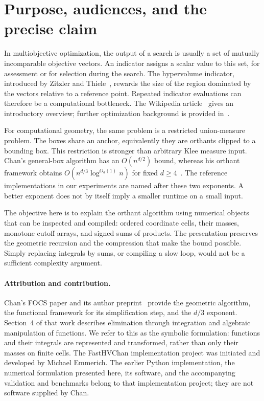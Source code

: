 \documentclass[12pt,a4paper]{article}
\theoremstyle{definition}
\begin{document}
\section{Purpose, audiences, and the precise claim}
\label{sec:introduction}

In multiobjective optimization, the output of a search is usually a set
of mutually incomparable objective vectors. An indicator assigns a scalar
value to this set, for assessment or for selection during the search.
The hypervolume indicator, introduced by Zitzler and Thiele~\cite{zitzlerthiele1998},
rewards the size of the region dominated by the vectors relative to a
reference point. Repeated indicator evaluations can therefore be a
computational bottleneck. The Wikipedia article~\cite{wikipediahv} gives
an introductory overview; further optimization background is provided
in~\cite{emmerichdeutz2018}.

For computational geometry, the same problem is a restricted union-measure
problem. The boxes share an anchor, equivalently they are orthants clipped
to a bounding box. This restriction is stronger than arbitrary Klee
measure input. Chan's general-box algorithm has an $O(n^{d/2})$ bound,
whereas his orthant framework obtains
$O(n^{d/3}\log^{O_d(1)}n)$ for fixed $d\ge4$~\cite{chan2013}.
The reference implementations in our experiments are named after these
two exponents. A better exponent does not by itself imply a smaller
runtime on a small input.

The objective here is to explain the orthant algorithm using numerical
objects that can be inspected and compiled: ordered coordinate cells,
their masses, monotone cutoff arrays, and signed sums of products.
The presentation preserves the geometric recursion and the compression
that make the bound possible. Simply replacing integrals by sums, or
compiling a slow loop, would not be a sufficient complexity argument.

\paragraph{Attribution and contribution.}
Chan's FOCS paper and its author preprint~\cite{chan2013} provide the
geometric algorithm, the functional framework for its simplification
step, and the $d/3$ exponent. Section~4 of that work describes elimination
through integration and algebraic manipulation of functions. We refer
to this as the symbolic formulation: functions and their integrals are
represented and transformed, rather than only their masses on finite cells.
The FastHVChan implementation project was initiated and developed by
Michael Emmerich. The earlier Python implementation, the numerical
formulation presented here, its software, and the accompanying validation
and benchmarks belong to that implementation project; they are not
software supplied by Chan.
\end{document}
